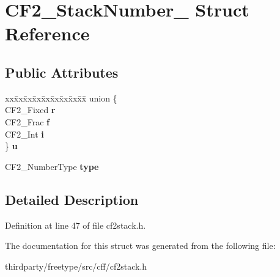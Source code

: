 \hypertarget{struct_c_f2___stack_number__}{}\section{C\+F2\+\_\+\+Stack\+Number\+\_\+ Struct Reference}
\label{struct_c_f2___stack_number__}
\subsection*{Public Attributes}
\begin{DoxyCompactItemize}
\item 
\mbox{\label{struct_c_f2___stack_number___aa18dd94869bcf87633998911472aa3be}} 
\begin{tabbing}
xx\=xx\=xx\=xx\=xx\=xx\=xx\=xx\=xx\=\kill
union \{\\
\>CF2\_Fixed {\bfseries r}\\
\>CF2\_Frac {\bfseries f}\\
\>CF2\_Int {\bfseries i}\\
\} {\bfseries u}\\

\end{tabbing}\item 
\mbox{\label{struct_c_f2___stack_number___a198405189f040b8cfbf3c9a64d0dc5e7}} 
C\+F2\+\_\+\+Number\+Type {\bfseries type}
\end{DoxyCompactItemize}


\subsection{Detailed Description}


Definition at line 47 of file cf2stack.\+h.



The documentation for this struct was generated from the following file\+:\begin{DoxyCompactItemize}
\item 
thirdparty/freetype/src/cff/cf2stack.\+h\end{DoxyCompactItemize}
